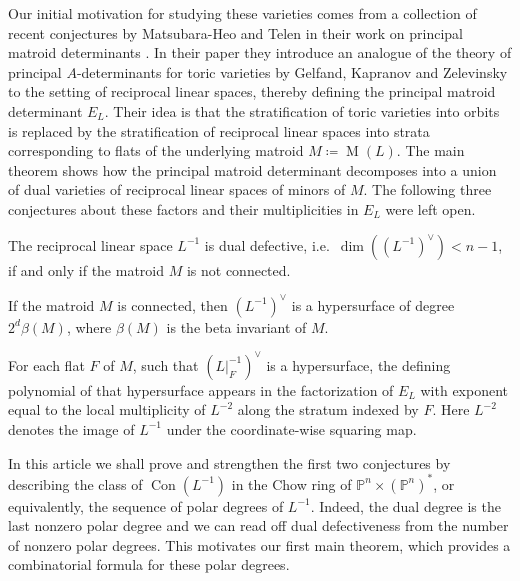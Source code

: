 \documentclass[12pt,a4paper,english]{scrartcl}
\newcommand{\PP}{\mathbb{P}}
\DeclareMathOperator{\Matroid}{M}
\DeclareMathOperator{\Con}{Con}
\begin{document}
Our initial motivation for studying these varieties comes from a collection of recent conjectures by Matsubara-Heo and Telen in their work on principal matroid determinants \cite{MatsubaraHeoTelen2026}. In their paper they introduce an analogue of the theory of principal $A$-determinants for toric varieties by Gelfand, Kapranov and Zelevinsky \cite{GKZ} to the  setting of reciprocal linear spaces, thereby defining the principal matroid determinant $ E_L$. Their idea is that the stratification of toric varieties into orbits  is replaced by the stratification of reciprocal linear spaces into strata corresponding to flats of the underlying matroid $M\coloneq \Matroid(L)$. The main theorem \cite[Theorem 1.2]{MatsubaraHeoTelen2026} shows how the principal matroid determinant decomposes into a union of dual varieties of reciprocal linear spaces of minors of $M$. %
The following three conjectures about these factors and their multiplicities in $E_L$ were left open.

\begin{conjecture}
\label{con:dualdef}
The reciprocal linear space $L^{-1}$ is dual defective, i.e.\ $\dim((L^{-1})^\vee)<n-1$,
if and only if the matroid $M$ is not connected.
\end{conjecture}
\begin{conjecture}
\label{con:dualdeg}
If the matroid $M$ is connected, then $(L^{-1})^\vee$ is a hypersurface of degree $2^d\beta(M)$, where $\beta(M)$ is the beta invariant of $M$.
\end{conjecture}
\begin{conjecture}
\label{con:multies}
    For each flat $F$ of $M$, such that $(L|_F^{-1})^\vee$ is a hypersurface, the defining polynomial of that hypersurface appears in the factorization of $ E_L$ with exponent equal to the local multiplicity of $L^{-2}$ along the stratum indexed by $F$. Here $L^{-2}$ denotes the image of $L^{-1}$ under the coordinate-wise squaring map.
\end{conjecture}

In this article we shall prove and strengthen the first two conjectures by describing the class of $\Con(L^{-1})$ in the Chow ring of $\PP^n\times (\PP^n)^*$, or equivalently, the sequence of polar degrees of $L^{-1}$. Indeed, the dual degree is the last nonzero polar degree and we can read off dual defectiveness from the number of nonzero polar degrees. This motivates our first main theorem, which provides a combinatorial formula for these polar degrees.
\end{document}

